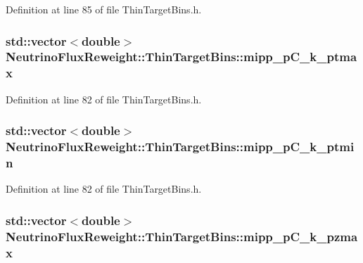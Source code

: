 Definition at line 85 of file Thin\-Target\-Bins.\-h.

\hypertarget{class_neutrino_flux_reweight_1_1_thin_target_bins_adda5c5dfe7c1edd42d1b95cc9ea2d356}{
\subsubsection[{mipp\-\_\-p\-C\-\_\-k\-\_\-ptmax}]{\setlength{\rightskip}{0pt plus 5cm}std\-::vector$<$double$>$ Neutrino\-Flux\-Reweight\-::\-Thin\-Target\-Bins\-::mipp\-\_\-p\-C\-\_\-k\-\_\-ptmax}}\label{class_neutrino_flux_reweight_1_1_thin_target_bins_adda5c5dfe7c1edd42d1b95cc9ea2d356}


Definition at line 82 of file Thin\-Target\-Bins.\-h.

\hypertarget{class_neutrino_flux_reweight_1_1_thin_target_bins_a46cab0c42e0918a6bac1f71710e0f886}{
\subsubsection[{mipp\-\_\-p\-C\-\_\-k\-\_\-ptmin}]{\setlength{\rightskip}{0pt plus 5cm}std\-::vector$<$double$>$ Neutrino\-Flux\-Reweight\-::\-Thin\-Target\-Bins\-::mipp\-\_\-p\-C\-\_\-k\-\_\-ptmin}}\label{class_neutrino_flux_reweight_1_1_thin_target_bins_a46cab0c42e0918a6bac1f71710e0f886}


Definition at line 82 of file Thin\-Target\-Bins.\-h.

\hypertarget{class_neutrino_flux_reweight_1_1_thin_target_bins_a6dea19227aba5888568c06753580cc71}{
\subsubsection[{mipp\-\_\-p\-C\-\_\-k\-\_\-pzmax}]{\setlength{\rightskip}{0pt plus 5cm}std\-::vector$<$double$>$ Neutrino\-Flux\-Reweight\-::\-Thin\-Target\-Bins\-::mipp\-\_\-p\-C\-\_\-k\-\_\-pzmax}}\label{class_neutrino_flux_reweight_1_1_thin_target_bins_a6dea19227aba5888568c06753580cc71}


